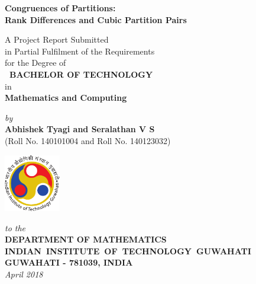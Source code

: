 \documentclass[12pt,a4paper]{report}
\theoremstyle{plain}
\theoremstyle{definition}
\theoremstyle{remark}
\begin{document}


\begin{titlepage}
\enlargethispage{3cm}

\begin{center}

\vspace*{-2cm}

\textbf{\Large Congruences of Partitions:} \\
\textbf{\Large Rank Differences and Cubic Partition Pairs}

\vfill

A Project Report Submitted \\
in Partial Fulfilment of the Requirements \\
for the Degree of \\[1cm]

{\bf\Large\ BACHELOR OF TECHNOLOGY }\\[.1in]
{\large {in}}\\[5pt]
{\large\bf {Mathematics and Computing}}\\[5pt]

 \vfill

{\large \emph{by}}\\[5pt]
{\large\bf {Abhishek Tyagi and Seralathan V S}}\\[5pt]
{\large (Roll No. 140101004 and Roll No. 140123032)}

\vfill
\includegraphics[height=2.5cm]{iitglogo}

\vspace*{0.5cm}

{\em\large to the}\\[10pt]
{\bf\large DEPARTMENT OF MATHEMATICS} \\[5pt]
{\bf\large \mbox{INDIAN INSTITUTE OF TECHNOLOGY GUWAHATI}}\\[5pt]
{\bf\large GUWAHATI - 781039, INDIA}\\[10pt]
{\it\large April 2018}
\end{center}

\end{titlepage}
\end{document}
